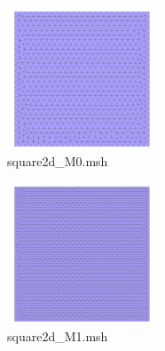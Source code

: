 \documentclass[english,10pt,a4paper]{article}
\begin{document}
\begin{multicols}{2}
  \begin{figure}[H]
  \centering
  \includegraphics[width=0.4\textwidth]{docs/modules/ROOT/images/square2d_M0.png}
  \caption{square2d\_M0.msh}
  \label{fig:mesh_square2d_M0}
  \end{figure}
  \columnbreak
  \begin{figure}[H]
  \centering
  \includegraphics[width=0.4\textwidth]{docs/modules/ROOT/images/square2d_M1.png}
  \caption{square2d\_M1.msh}
  \label{fig:mesh_square2d_M1}
  \end{figure}
  \end{multicols}
\end{document}
